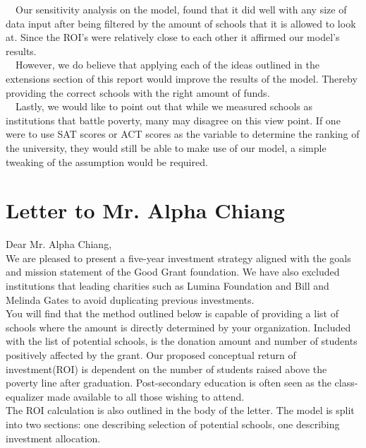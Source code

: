 \documentclass[12pt]{scrartcl}
\begin{document}
	\ \ Our sensitivity analysis on the model, found that it did well with any size of data input after being filtered by the amount of schools that it is allowed to look at. Since the ROI's were relatively close to each other it affirmed our model's results.\\
	
	\ \ However, we do believe that applying each of the ideas outlined in the extensions section of this report would improve the results of the model. Thereby providing the correct schools with the right amount of funds.\\
	
	\ \ Lastly, we would like to point out that while we measured schools as institutions that battle poverty, many may disagree on this view point. If one were to use SAT scores or ACT scores as the variable to determine the ranking of the university, they would still be able to make use of our model, a simple tweaking of the assumption would be required.
\clearpage

\section{Letter to Mr. Alpha Chiang}
Dear Mr. Alpha Chiang, \\

We are pleased to present a five-year investment strategy aligned with the goals and mission statement of the Good Grant foundation. We have also excluded institutions that leading charities such as Lumina Foundation and Bill and Melinda Gates to avoid duplicating previous investments.\\

You will find that the method outlined below is capable of providing a list of schools where the amount is directly determined by your organization. Included with the list of potential schools, is the donation amount and number of students positively affected by the grant. Our proposed conceptual return of investment(ROI) is dependent on the number of students raised above the poverty line after graduation. Post-secondary education is often seen as the class-equalizer made available to all those wishing to attend. \\

The ROI calculation is also outlined in the body of the letter. The model is split into two sections: one describing selection of potential schools, one describing investment allocation. \\
\end{document}
